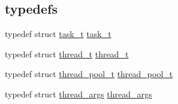 \subsection*{\textquotesingle{}typedefs\textquotesingle{}}
\begin{DoxyCompactItemize}
\item 
typedef struct \hyperlink{structtask__t}{task\+\_\+t} \hyperlink{G-2313-06-P1__thread__pool_8h_a989e278a815d7ada960572a3e9fad896}{task\+\_\+t}
\item 
typedef struct \hyperlink{structthread__t}{thread\+\_\+t} \hyperlink{G-2313-06-P1__thread__pool_8h_a6e84f6599234bedf30a8b88f56e8fd48}{thread\+\_\+t}
\item 
typedef struct \hyperlink{structthread__pool__t}{thread\+\_\+pool\+\_\+t} \hyperlink{G-2313-06-P1__thread__pool_8h_a5f14d1f0d9a94d2e45b01104049529eb}{thread\+\_\+pool\+\_\+t}
\item 
typedef struct \hyperlink{structthread__args}{thread\+\_\+args} \hyperlink{G-2313-06-P1__thread__pool_8h_ae7684b0001f8477707ef97e117e09d31}{thread\+\_\+args}
\end{DoxyCompactItemize}
